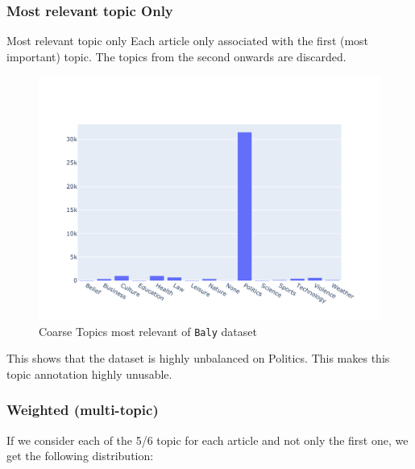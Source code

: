 \subsubsection{Most relevant topic Only}

Most relevant topic only
Each article only associated with the first (most important) topic. The topics from the second onwards are discarded.

\begin{figure}[!htbp]
    \centering
    \includegraphics[width=\linewidth]{figures/baly_coarse_first.pdf}
    \caption{Coarse Topics most relevant of \texttt{Baly} dataset}
    \label{fig:baly_coarse_first}
\end{figure}

This shows that the dataset is highly unbalanced on Politics. This makes this topic annotation highly unusable.

\subsubsection{Weighted (multi-topic)}
If we consider each of the 5/6 topic for each article and not only the first one, we get the following distribution:

